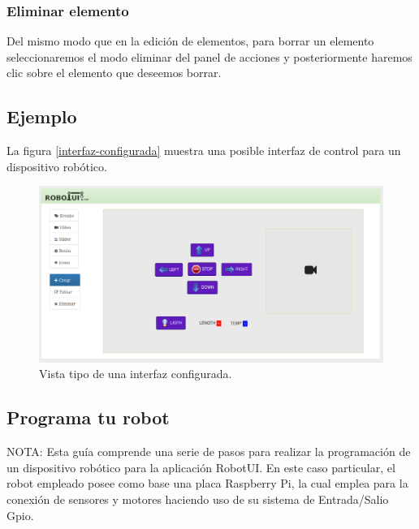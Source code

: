 \subsubsection{Eliminar elemento}

Del mismo modo que en la edición de elementos, para borrar un elemento seleccionaremos el modo eliminar   del panel de acciones y posteriormente haremos clic sobre el elemento que deseemos borrar.\\


\subsection{Ejemplo}

La figura \ref{interfaz-configurada} muestra una posible interfaz de control para un dispositivo robótico.

\begin{figure}[H]
  \begin{center}
    \includegraphics[scale=.4]{imagenes/manual-usuario/interfaz-creada.png}
  \end{center}
  \caption{Vista tipo de una interfaz configurada.}
  \label{website:interfaz-configurada}
\end{figure}



\subsection{ Programa tu robot }
\label{sec:programacion-robot}

NOTA: Esta guía comprende una serie de pasos para realizar la programación de un dispositivo robótico para la aplicación RobotUI. En este caso particular, el robot empleado posee como base una placa 
Raspberry Pi, la cual emplea para la conexión de sensores y motores haciendo uso de su sistema de Entrada/Salio Gpio.\\

